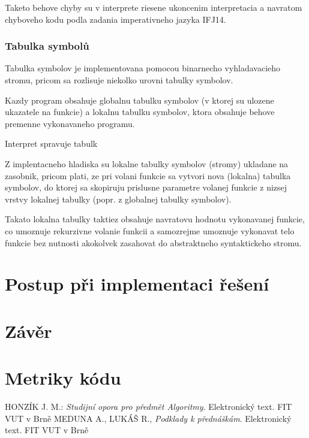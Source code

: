 \documentclass[12pt,a4paper,titlepage,final]{article}
\begin{document}
Taketo behove chyby su v interprete riesene ukoncenim interpretacia a navratom
chyboveho kodu podla zadania imperativneho jazyka IFJ14.

\subsubsection{Tabulka symbolů} \label{tabulka_symbolu}

Tabulka symbolov je implementovana pomocou binarnecho vyhladavacieho stromu,
pricom sa rozlisuje niekolko urovni tabulky symbolov.

Kazdy program obsahuje globalnu tabulku symbolov (v ktorej su ulozene ukazatele
na funkcie) a lokalnu tabulku symbolov, ktora obsahuje behove premenne
vykonavaneho programu.

Interpret spravuje tabulk

Z implentacneho hladiska su lokalne tabulky symbolov (stromy) ukladane na
zasobnik, pricom plati, ze pri volani funkcie sa vytvori nova (lokalna)
tabulka symbolov, do ktorej sa skopiruju prislusne parametre volanej funkcie z
nizsej vrstvy lokalnej tabulky (popr. z globalnej tabulky symbolov).

Takato lokalna tabulky taktiez obsahuje navratovu hodnotu vykonavanej funkcie,
co umoznuje rekurzivne volanie funkcii a samozrejme umoznuje vykonavat telo
funkcie bez nutnosti akokolvek zasahovat do abstraktneho syntaktickeho stromu.


\section{Postup při implementaci řešení} \label{postup_pri_implementaci_reseni}

\section{Závěr} \label{zaver}

\appendix

\section{Metriky kódu} \label{metriky}

\begin{thebibliography}{1}

HONZÍK J. M.: \emph{Studijní opora pro předmět Algoritmy}. Elektronický text. FIT VUT v Brně
MEDUNA A., LUKÁŠ R., \emph{Podklady k přednáškám}. Elektronický text. FIT VUT v Brně


\end{thebibliography}
\appendix
\end{document}
